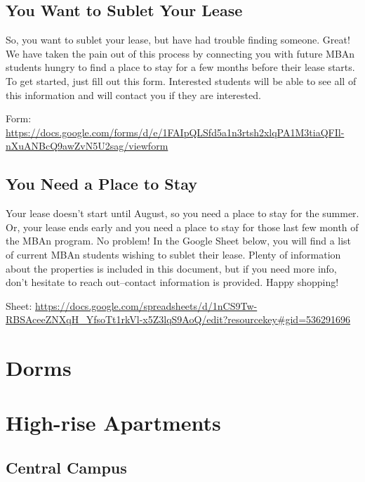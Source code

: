\documentclass[
]{book}
\begin{document}
\hypertarget{you-want-to-sublet-your-lease}{%
\subsection{You Want to Sublet Your Lease}\label{you-want-to-sublet-your-lease}}

So, you want to sublet your lease, but have had trouble finding someone. Great! We have taken the pain out of this process by connecting you with future MBAn students hungry to find a place to stay for a few months before their lease starts. To get started, just fill out this form. Interested students will be able to see all of this information and will contact you if they are interested.

Form: \url{https://docs.google.com/forms/d/e/1FAIpQLSfd5a1n3rtsh2xlqPA1M3tiaQFIl-nXuANBcQ9awZvN5U2sag/viewform}

\hypertarget{you-need-a-place-to-stay}{%
\subsection{You Need a Place to Stay}\label{you-need-a-place-to-stay}}

Your lease doesn't start until August, so you need a place to stay for the summer. Or, your lease ends early and you need a place to stay for those last few month of the MBAn program. No problem! In the Google Sheet below, you will find a list of current MBAn students wishing to sublet their lease. Plenty of information about the properties is included in this document, but if you need more info, don't hesitate to reach out--contact information is provided. Happy shopping!

Sheet: \url{https://docs.google.com/spreadsheets/d/1nCS9Tw-RBSAceeZNXqH_YfsoTt1rkVl-x5Z3lqS9AoQ/edit?resourcekey\#gid=536291696}

\hypertarget{dorms}{%
\section{Dorms}\label{dorms}}

\hypertarget{high-rise-apartments}{%
\section{High-rise Apartments}\label{high-rise-apartments}}

\hypertarget{central-campus}{%
\subsection{Central Campus}\label{central-campus}}
\end{document}

